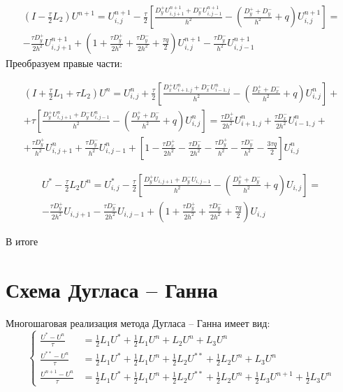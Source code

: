\documentclass[a4paper,12pt]{article}
\begin{document}
\begin{multline*}
        \left( I - \frac{\tau}{2} L_2 \right) U^{n+1} = U^{n+1}_{i,j} - \frac{\tau}{2} \left[ \frac{D^+_y U^{n+1}_{i,j+1} + D^-_y U^{n+1}_{i,j-1}}{h^2} - \left(\frac{D^+_y + D^-_y}{h^2} + q \right) U^{n+1}_{i,j} \right] = \\
    - \frac{\tau D^+_y }{2 h^2} U^{n+1}_{i,j+1} + \left(1 + \frac{\tau D^+_y}{2h^2} + \frac{\tau D^-_y}{2 h^2} + \frac{\tau q}{2} \right) U^{n+1}_{i,j} - \frac{\tau D^-_y}{h^2} U^{n+1}_{i,j-1}
\end{multline*}
Преобразуем правые части:

\begin{multline*}
  \left( I + \frac{\tau}{2} L_1 + \tau L_2 \right) U^n = U^n_{i,j} + \frac{\tau}{2} \left[ \frac{D^+_x U^n_{i+1,j} + D^-_x U^n_{i-1,j}}{h^2} - \left(\frac{D^+_x + D^-_x}{h^2} + q \right) U^n_{i,j} \right] + \\  + \tau \left[ \frac{D^+_y U^n_{i,j+1} + D^-_y U^n_{i,j-1}}{h^2} - \left(\frac{D^+_y + D^-_y}{h^2} + q \right) U^n_{i,j} \right]
= \frac{\tau D^+_x}{2 h^2} U^n_{i+1,j} + \frac{\tau D^-_x}{2 h^2} U^n_{i-1,j} + \\ + \frac{\tau D^+_y}{h^2} U^n_{i,j+1} + \frac{\tau D^-_y}{h^2} U^n_{i,j-1} + \left[ 1 - \frac{\tau D^+_x}{2h^2} - \frac{\tau D^-_x}{2h^2} - \frac{ \tau D^+_y}{h^2} - \frac{\tau D^-_y}{h^2} - \frac{3 \tau q}{2} \right] U^n_{i,j}
\end{multline*}


\begin{multline*}
  U^* - \frac{\tau}{2} L_2 U^n = U_{i,j}^* - \frac{\tau}{2} \left[ \frac{D^+_y U_{i,j+1} + D^-_y U_{i,j-1}}{h^2} - \left(\frac{D^+_y + D^-_y}{h^2} + q \right) U_{i,j} \right] = \\
- \frac{\tau D^+_y}{2 h^2} U_{i,j+1} - \frac{\tau D^-_y}{2 h^2} U_{i,j-1} + \left( 1 + \frac{\tau D^+_y}{2 h^2} + \frac{\tau D^-_y}{2 h^2} + \frac{\tau q}{2} \right) U_{i,j}
\end{multline*}

В итоге




\section{Схема Дугласа -- Ганна}


Многошаговая реализация метода Дугласа -- Ганна имеет вид:
\begin{equation}
  \label{eq:Douglas-Gunn}
  \begin{cases}
    \frac{U^{*}   - U^n}{\tau} &= \frac{1}{2} L_1 U^{*}  + \frac{1}{2} L_1 U^n +  L_2 U^n +  L_3 U^n \\
    \frac{U^{**}  - U^n}{\tau} &= \frac{1}{2} L_1 U^{*}  + \frac{1}{2} L_1 U^n +
                                \frac{1}{2} L_2 U^{**} + \frac{1}{2} L_2 U^n + L_3 U^n \\
    \frac{U^{n+1} - U^n}{\tau} &= \frac{1}{2} L_1 U^{*}   + \frac{1}{2} L_1 U^n +
                                \frac{1}{2} L_2 U^{**}  + \frac{1}{2} L_2 U^n +
                                \frac{1}{2} L_3 U^{n+1} + \frac{1}{2} L_3 U^n

  \end{cases}
\end{equation}
\end{document}
